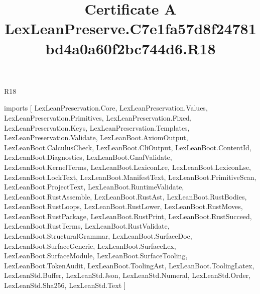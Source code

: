 \begin{lexlean}{R18}
\title{Certificate A LexLeanPreserve.C7e1fa57d8f24781bd4a0a60f2bc744d6.R18}
\begin{coremodule}
imports [
  LexLeanPreservation.Core,
  LexLeanPreservation.Values,
  LexLeanPreservation.Primitives,
  LexLeanPreservation.Fixed,
  LexLeanPreservation.Keys,
  LexLeanPreservation.Templates,
  LexLeanPreservation.Validate,
  LexLeanBoot.AxiomOutput,
  LexLeanBoot.CalculusCheck,
  LexLeanBoot.CliOutput,
  LexLeanBoot.ContentId,
  LexLeanBoot.Diagnostics,
  LexLeanBoot.GnafValidate,
  LexLeanBoot.KernelTerms,
  LexLeanBoot.LexiconLre,
  LexLeanBoot.LexiconLse,
  LexLeanBoot.LockText,
  LexLeanBoot.ManifestText,
  LexLeanBoot.PrimitiveScan,
  LexLeanBoot.ProjectText,
  LexLeanBoot.RuntimeValidate,
  LexLeanBoot.RustAssemble,
  LexLeanBoot.RustAst,
  LexLeanBoot.RustBodies,
  LexLeanBoot.RustLoops,
  LexLeanBoot.RustLower,
  LexLeanBoot.RustMoves,
  LexLeanBoot.RustPackage,
  LexLeanBoot.RustPrint,
  LexLeanBoot.RustSucceed,
  LexLeanBoot.RustTerms,
  LexLeanBoot.RustValidate,
  LexLeanBoot.StructuralGrammar,
  LexLeanBoot.SurfaceDoc,
  LexLeanBoot.SurfaceGeneric,
  LexLeanBoot.SurfaceLex,
  LexLeanBoot.SurfaceModule,
  LexLeanBoot.SurfaceTooling,
  LexLeanBoot.TokenAudit,
  LexLeanBoot.ToolingAst,
  LexLeanBoot.ToolingLatex,
  LexLeanStd.Buffer,
  LexLeanStd.Json,
  LexLeanStd.Numeral,
  LexLeanStd.Order,
  LexLeanStd.Sha256,
  LexLeanStd.Text
]


\end{coremodule}
\end{lexlean}

